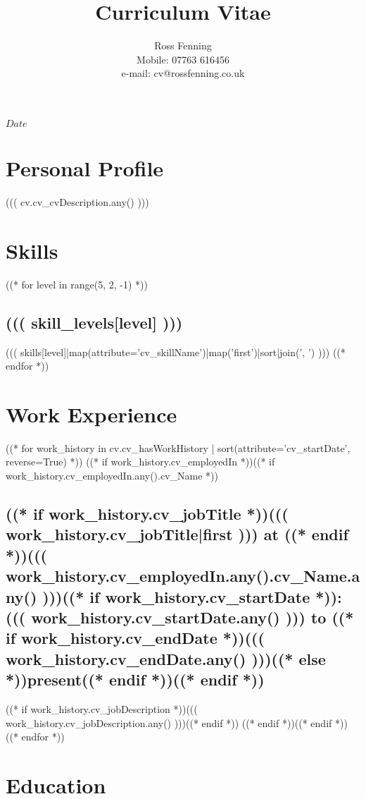 \documentclass[10pt]{article}
\begin{document}
\title{\bf{Curriculum Vitae}}
\author{
  Ross Fenning\\
  Mobile: 07763 616456\\
  e-mail: cv@rossfenning.co.uk
}

\SVNdate $Date$
\maketitle

\hrulefill

\section*{Personal Profile}
((( cv.cv_cvDescription.any() )))

\section*{Skills}

((* for level in range(5, 2, -1) *))
\subsection*{((( skill_levels[level] )))}

((( skills[level]|map(attribute='cv_skillName')|map('first')|sort|join(', ') )))
((* endfor *))


\section*{Work Experience}

((* for work_history in cv.cv_hasWorkHistory | sort(attribute='cv_startDate', reverse=True) *))
((* if work_history.cv_employedIn *))((* if work_history.cv_employedIn.any().cv_Name *))
\subsection*{((* if work_history.cv_jobTitle *))((( work_history.cv_jobTitle|first ))) at ((* endif *))((( work_history.cv_employedIn.any().cv_Name.any() )))((* if work_history.cv_startDate *)): ((( work_history.cv_startDate.any() ))) to ((* if work_history.cv_endDate *))((( work_history.cv_endDate.any() )))((* else *))present((* endif *))((* endif *))}

((* if work_history.cv_jobDescription *))((( work_history.cv_jobDescription.any() )))((* endif *))
((* endif *))((* endif *))
((* endfor *))


\section*{Education}
\end{document}
